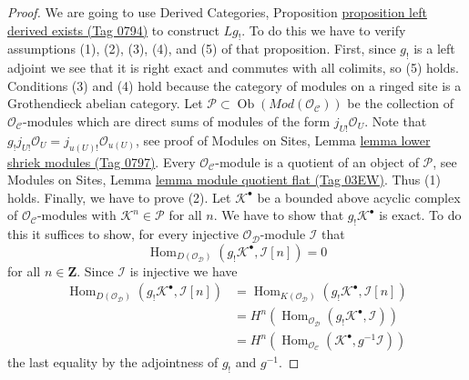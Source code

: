 \documentclass{amsart}
\theoremstyle{plain}
\theoremstyle{definition}
\theoremstyle{remark}
\numberwithin{equation}{subsection}
\def\Hom{\mathop{\mathrm{Hom}}\nolimits}
\def\Ob{\mathop{\mathrm{Ob}}\nolimits}
\begin{document}
\begin{proof}
We are going to use
Derived Categories, Proposition \href{https://stacks.math.columbia.edu/tag/0794}{proposition left derived exists (Tag 0794)}
to construct $Lg_!$. To do this we have to verify assumptions
(1), (2), (3), (4), and (5) of that proposition.
First, since $g_!$ is a left adjoint
we see that it is right exact and commutes with all colimits, so
(5) holds. Conditions (3) and (4) hold because the category of modules
on a ringed site is a Grothendieck abelian category.
Let $\mathcal{P} \subset \Ob(\textit{Mod}(\mathcal{O}_\mathcal{C}))$
be the collection of $\mathcal{O}_\mathcal{C}$-modules which are direct
sums of modules of the form $j_{U!}\mathcal{O}_U$. Note that
$g_!j_{U!}\mathcal{O}_U = j_{u(U)!} \mathcal{O}_{u(U)}$, see proof of
Modules on Sites, Lemma \href{https://stacks.math.columbia.edu/tag/0797}{lemma lower shriek modules (Tag 0797)}.
Every $\mathcal{O}_\mathcal{C}$-module is a quotient of an object of
$\mathcal{P}$, see
Modules on Sites, Lemma \href{https://stacks.math.columbia.edu/tag/03EW}{lemma module quotient flat (Tag 03EW)}.
Thus (1) holds. Finally, we have to prove (2).
Let $\mathcal{K}^\bullet$ be a bounded above acyclic complex of
$\mathcal{O}_\mathcal{C}$-modules with $\mathcal{K}^n \in \mathcal{P}$
for all $n$. We have to show that $g_!\mathcal{K}^\bullet$ is
exact. To do this it suffices to show, for every injective
$\mathcal{O}_\mathcal{D}$-module $\mathcal{I}$ that
$$
\Hom_{D(\mathcal{O}_\mathcal{D})}(
g_!\mathcal{K}^\bullet, \mathcal{I}[n]) = 0
$$
for all $n \in \mathbf{Z}$. Since $\mathcal{I}$ is injective we have
\begin{align*}
\Hom_{D(\mathcal{O}_\mathcal{D})}(
g_!\mathcal{K}^\bullet, \mathcal{I}[n])
& =
\Hom_{K(\mathcal{O}_\mathcal{D})}(
g_!\mathcal{K}^\bullet, \mathcal{I}[n]) \\
& =
H^n(\Hom_{\mathcal{O}_\mathcal{D}}(
g_!\mathcal{K}^\bullet, \mathcal{I})) \\
& =
H^n(\Hom_{\mathcal{O}_\mathcal{C}}(
\mathcal{K}^\bullet, g^{-1}\mathcal{I}))
\end{align*}
the last equality by the adjointness of $g_!$ and $g^{-1}$.


\end{proof}
\end{document}
